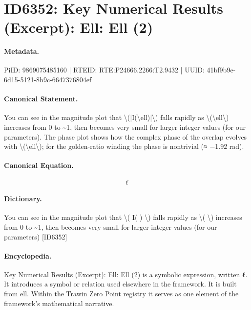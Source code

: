 \section*{ID6352: Key Numerical Results (Excerpt): Ell: Ell (2)}
\paragraph{Metadata.}
PiID: 9869075485160 | RTEID: RTE:P24666.2266:T2.9432 | UUID: 41bf9b9e-6d15-5121-8b9c-6647376804ef

\paragraph{Canonical Statement.}
You can see in the magnitude plot that \textbackslash{}(|I(\textbackslash{}ell)|\textbackslash{}) falls rapidly as \textbackslash{}(\textbackslash{}ell\textbackslash{}) increases from 0 to \textasciitilde{}1, then becomes very small for larger integer values (for our parameters). The phase plot shows how the complex phase of the overlap evolves with \textbackslash{}(\textbackslash{}ell\textbackslash{}); for the golden-ratio winding the phase is nontrivial (≈ −1.92 rad).

\paragraph{Canonical Equation.}
\[
\ell
\]

\paragraph{Dictionary.}
You can see in the magnitude plot that \textbackslash{}( I( ) \textbackslash{}) falls rapidly as \textbackslash{}( \textbackslash{}) increases from 0 to \textasciitilde{}1, then becomes very small for larger integer values (for our parameters) [ID6352]

\paragraph{Encyclopedia.}
Key Numerical Results (Excerpt): Ell: Ell (2) is a symbolic expression, written ℓ. It introduces a symbol or relation used elsewhere in the framework. It is built from ell. Within the Trawin Zero Point registry it serves as one element of the framework's mathematical narrative.
